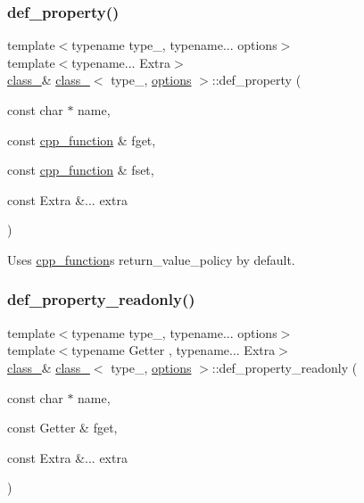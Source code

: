 \subsubsection{\texorpdfstring{def\_property()}{def\_property()}\hspace{0.1cm}{\footnotesize\ttfamily [3/3]}}
{\footnotesize\ttfamily template$<$typename type\+\_\+, typename... options$>$ \\
template$<$typename... Extra$>$ \\
\mbox{\hyperlink{classclass__}{class\+\_\+}}\& \mbox{\hyperlink{classclass__}{class\+\_\+}}$<$ type\+\_\+, \mbox{\hyperlink{classoptions}{options}} $>$\+::def\+\_\+property (\begin{DoxyParamCaption}\item[{const char $\ast$}]{name,  }\item[{const \mbox{\hyperlink{classcpp__function}{cpp\+\_\+function}} \&}]{fget,  }\item[{const \mbox{\hyperlink{classcpp__function}{cpp\+\_\+function}} \&}]{fset,  }\item[{const Extra \&...}]{extra }\end{DoxyParamCaption})\hspace{0.3cm}{\ttfamily [inline]}}



Uses \mbox{\hyperlink{classcpp__function}{cpp\+\_\+function}}\textquotesingle{}s return\+\_\+value\+\_\+policy by default. 

\mbox{\label{classclass___a0b005f5ca971191308806807682cdf94}} 
\subsubsection{\texorpdfstring{def\_property\_readonly()}{def\_property\_readonly()}\hspace{0.1cm}{\footnotesize\ttfamily [1/2]}}
{\footnotesize\ttfamily template$<$typename type\+\_\+, typename... options$>$ \\
template$<$typename Getter , typename... Extra$>$ \\
\mbox{\hyperlink{classclass__}{class\+\_\+}}\& \mbox{\hyperlink{classclass__}{class\+\_\+}}$<$ type\+\_\+, \mbox{\hyperlink{classoptions}{options}} $>$\+::def\+\_\+property\+\_\+readonly (\begin{DoxyParamCaption}\item[{const char $\ast$}]{name,  }\item[{const Getter \&}]{fget,  }\item[{const Extra \&...}]{extra }\end{DoxyParamCaption})\hspace{0.3cm}{\ttfamily [inline]}}



